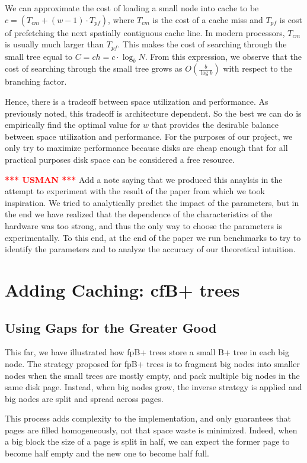 \documentclass{article}
\newcommand{\usman}{\textcolor{Red}{\textbf{*** USMAN ***} }}
\begin{document}
We can approximate the cost of loading a small node into cache to be $c =
(T_{cm} + (w-1)\cdot T_{pf})$, where $T_{cm}$ is the cost of a cache miss and
$T_{pf}$ is cost of prefetching the next spatially contiguous cache line. In
modern processors, $T_{cm}$ is usually much larger than $T_{pf}$. This makes the
cost of searching through the small tree equal to $C = ch = c\cdot \log_b N$. From this expression, we 
observe that the cost of searching through the small tree grows as 
$\displaystyle O\left(\frac{b}{\log b}\right)$ with respect to the branching factor.

Hence, there is a tradeoff between space utilization and performance. As 
previously noted, this tradeoff is architecture dependent. So the best we can
do is empirically find the optimal value for $w$ that provides the desirable balance
between space utilization and performance. For the purposes of our project, we
only try to maximize performance because disks are cheap enough that for all practical purposes
disk space can be considered a free resource.

\usman Add a note saying that we produced this anaylsis in the attempt to experiment with the
result of the paper from which we took inspiration.
We tried to analytically predict the impact of the parameters, but in the end we have
realized that the dependence of the characteristics of the hardware was too strong,
and thus the only way to choose the parameters is experimentally.
To this end, at the end of the paper we run benchmarks to try to identify the
parameters and to analyze the accuracy of our theoretical intuition. 

\section{Adding Caching: cfB+ trees}
\subsection{Using Gaps for the Greater Good}
This far, we have illustrated how fpB+ trees store a small B+ tree in each big
node.
The strategy proposed for fpB+ trees is to fragment big nodes into smaller nodes
when the small trees
are mostly empty, and pack multiple big nodes in the same disk page.
Instead, when big nodes grow, the inverse strategy is applied and big nodes are
split and spread
across pages.

This process adds complexity to the implementation, and only guarantees that
pages are filled
homogeneously, not that space waste is minimized.
Indeed, when a big block the size of a page is split in half,
we can expect the former page to become half empty and the new one to become
half full.
\end{document}
